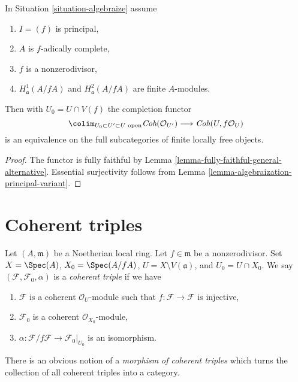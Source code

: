 \begin{lemma}
\label{lemma-equivalence}
In Situation \ref{situation-algebraize} assume
\begin{enumerate}
\item $I = (f)$ is principal,
\item $A$ is $f$-adically complete,
\item $f$ is a nonzerodivisor,
\item $H^1_\mathfrak a(A/fA)$ and $H^2_\mathfrak a(A/fA)$
are finite $A$-modules.
\end{enumerate}
Then with $U_0 = U \cap V(f)$ the completion functor
$$
\colim_{U_0 \subset U' \subset U\text{ open}}
\textit{Coh}(\mathcal{O}_{U'})
\longrightarrow
\textit{Coh}(U, f\mathcal{O}_U)
$$
is an equivalence on the full subcategories of finite locally free objects.
\end{lemma}

\begin{proof}
The functor is fully faithful by
Lemma \ref{lemma-fully-faithful-general-alternative}.
Essential surjectivity follows from
Lemma \ref{lemma-algebraization-principal-variant}.
\end{proof}








\section{Coherent triples}
\label{section-coherent-triples}

\noindent
Let $(A, \mathfrak m)$ be a Noetherian local ring.
Let $f \in \mathfrak m$ be a nonzerodivisor. Set
$X = \Spec(A)$, $X_0 = \Spec(A/fA)$, $U = X \setminus V(\mathfrak a)$, and
$U_0 = U \cap X_0$.
We say $(\mathcal{F}, \mathcal{F}_0, \alpha)$ is a {\it coherent triple}
if we have
\begin{enumerate}
\item $\mathcal{F}$ is a coherent $\mathcal{O}_U$-module such that
$f : \mathcal{F} \to \mathcal{F}$ is injective,
\item $\mathcal{F}_0$ is a coherent $\mathcal{O}_{X_0}$-module,
\item $\alpha : \mathcal{F}/f\mathcal{F} \to \mathcal{F}_0|_{U_0}$
is an isomorphism.
\end{enumerate}
There is an obvious notion of a {\it morphism of coherent triples}
which turns the collection of all coherent triples into a category.

